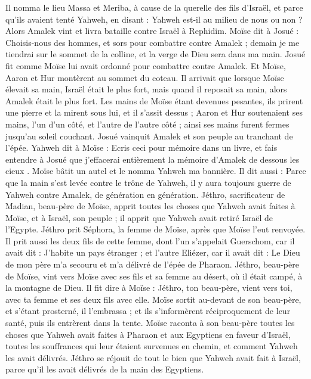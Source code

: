 \begin{multicols}{2}
Il nomma le lieu Massa et Meriba, à cause de la querelle des fils d'Israël, et parce qu'ils avaient tenté Yahweh, en disant : Yahweh est-il au milieu de nous ou non ?
Alors Amalek vint et livra bataille contre Israël à Rephidim.
Moïse dit à Josué : Choisis-nous des hommes, et sors pour combattre contre Amalek ; demain je me tiendrai sur le sommet de la colline, et la verge de Dieu sera dans ma main.
Josué fit comme Moïse lui avait ordonné pour combattre contre Amalek. Et Moïse, Aaron et Hur montèrent au sommet du coteau.
Il arrivait que lorsque Moïse élevait sa main, Israël était le plus fort, mais quand il reposait sa main, alors Amalek était le plus fort.
Les mains de Moïse étant devenues pesantes, ils prirent une pierre et la mirent sous lui, et il s'assit dessus ; Aaron et Hur soutenaient ses mains, l'un d’un côté, et l'autre de l’autre côté ; ainsi ses mains furent fermes jusqu'au soleil couchant.
Josué vainquit Amalek et son peuple au tranchant de l'épée.
Yahweh dit à Moïse : Ecris ceci pour mémoire dans un livre, et fais entendre à Josué que j'effacerai entièrement la mémoire d'Amalek de dessous les cieux .
Moïse bâtit un autel et le nomma Yahweh ma bannière.
Il dit aussi : Parce que la main s’est levée contre le trône de Yahweh, il y aura toujours guerre de Yahweh contre Amalek, de génération en génération.
\VerseOne{}Jéthro, sacrificateur de Madian, beau-père de Moïse, apprit toutes les choses que Yahweh avait faites à Moïse, et à Israël, son peuple ; il apprit que Yahweh avait retiré Israël de l'Egypte.
Jéthro prit Séphora, la femme de Moïse, après que Moïse l'eut renvoyée.
Il prit aussi les deux fils de cette femme, dont l'un s'appelait Guerschom, car il avait dit : J’habite un pays étranger ;
et l'autre Eliézer, car il avait dit : Le Dieu de mon père m'a secouru et m'a délivré de l'épée de Pharaon.
Jéthro, beau-père de Moïse, vint vers Moïse avec ses fils et sa femme au désert, où il était campé, à la montagne de Dieu.
Il fit dire à Moïse : Jéthro, ton beau-père, vient vers toi, avec ta femme et ses deux fils avec elle.
Moïse sortit au-devant de son beau-père, et s'étant prosterné, il l’embrassa ; et ils s’informèrent réciproquement de leur santé, puis ils entrèrent dans la tente.
Moïse raconta à son beau-père toutes les choses que Yahweh avait faites à Pharaon et aux Egyptiens en faveur d'Israël, toutes les souffrances qui leur étaient survenues en chemin, et comment Yahweh les avait délivrés.
Jéthro se réjouit de tout le bien que Yahweh avait fait à Israël, parce qu'il les avait délivrés de la main des Egyptiens.

\end{multicols}
